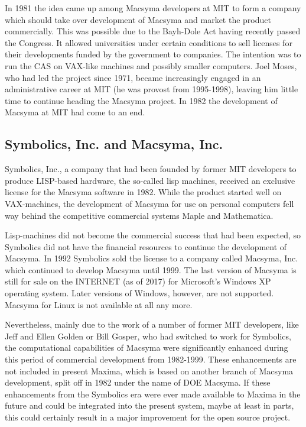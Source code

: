 \documentclass[../Maxima_Workbook.tex]{subfiles}
\begin{document}
In 1981 the idea came up among Macsyma developers at MIT to form a company which should take over development of Macsyma and market the product commercially. This was possible due to the Bayh-Dole Act having recently passed the Congress. It allowed universities under certain conditions to sell licenses for their developments funded by the government to companies. The intention was to run the CAS on VAX-like machines and possibly smaller computers. Joel Moses, who had led the project since 1971, became increasingly engaged in an administrative career at MIT (he was provost from 1995-1998), leaving him little time to continue heading the Macsyma project. In 1982 the development of Macsyma at MIT had come to an end.

\subsection{Symbolics, Inc. and Macsyma, Inc.}

Symbolics, Inc., a company that had been founded by former MIT developers to produce LISP-based hardware, the so-called lisp machines, received an exclusive license for the Macsyma software in 1982. While the product started well on VAX-machines, the development of Macsyma for use on personal computers fell way behind the competitive commercial systems Maple and Mathematica.

\lz Lisp-machines did not become the commercial success that had been expected, so Symbolics did not have the financial resources to continue the development of Macsyma. In 1992 Symbolics sold the license to a company called Macsyma, Inc. which continued to develop Macsyma until 1999. The last version of Macsyma is still for sale on the INTERNET (as of 2017) for Microsoft's Windows XP operating system. Later versions of Windows, however, are not supported. Macsyma for Linux is not available at all any more.

\lz Nevertheless, mainly due to the work of a number of former MIT developers, like Jeff and Ellen Golden or Bill Gosper, who had switched to work for Symbolics, the computational capabilities of Macsyma were significantly enhanced during this period of commercial development from 1982-1999. These enhancements are not included in present Maxima, which is based on another branch of Macsyma development, split off in 1982 under the name of DOE Macsyma. If these enhancements from the Symbolics era were ever made available to Maxima in the future and could be integrated into the present system, maybe at least in parts, this could certainly result in a major improvement for the open source project.
\end{document}
